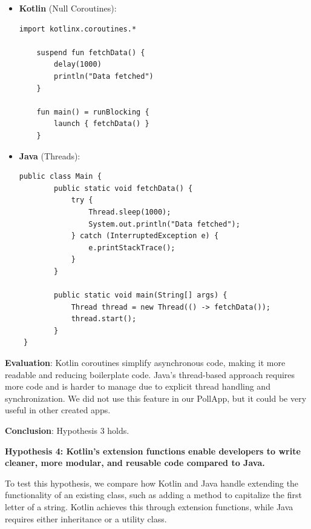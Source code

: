 \begin{tcolorbox}[colframe=blue!80!black, colback=blue!5!white, coltitle=blue!50!black, title={-}]
    \begin{itemize}
	\vspace{0.5cm}
        \item \textbf{Kotlin} (Null Coroutines):
        \begin{lstlisting}[style=kotlin]
    import kotlinx.coroutines.*

    suspend fun fetchData() {
        delay(1000)
        println("Data fetched")
    }

    fun main() = runBlocking {
        launch { fetchData() }
    }
        \end{lstlisting}
        
        \item \textbf{Java} (Threads):
        \begin{lstlisting}[style=java]
 public class Main {
        public static void fetchData() {
            try {
                Thread.sleep(1000);
                System.out.println("Data fetched");
            } catch (InterruptedException e) {
                e.printStackTrace();
            }
        }

        public static void main(String[] args) {
            Thread thread = new Thread(() -> fetchData());
            thread.start();
        }
 }
        \end{lstlisting}
    \end{itemize}
\end{tcolorbox}

\noindent \textbf{Evaluation}: Kotlin coroutines simplify asynchronous code, making it more readable and reducing boilerplate code. Java’s thread-based approach requires more code and is harder to manage due to explicit thread handling and synchronization. We did not use this feature in our PollApp, but it could be very useful in other created apps.

\vspace{1em}

\textbf{Conclusion}: Hypothesis 3 holds.

\vspace{1em}

\noindent \textbf{Hypothesis 4: Kotlin's extension functions enable developers to write cleaner, more modular, and reusable code compared to Java.}

\vspace{1em}

\noindent To test this hypothesis, we compare how Kotlin and Java handle extending the functionality of an existing class, such as adding a method to capitalize the first letter of a string. Kotlin achieves this through extension functions, while Java requires either inheritance or a utility class.


